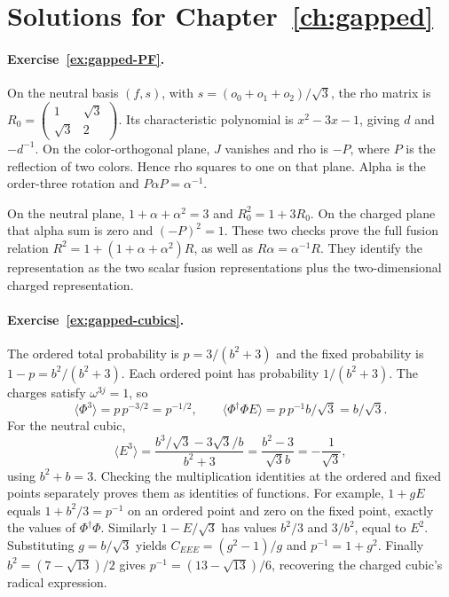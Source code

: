 \section{Solutions for Chapter~\ref{ch:gapped}}

\paragraph{Exercise~\ref{ex:gapped-PF}.}
\label{sol:ex:gapped-PF}
On the neutral basis $(f,s)$, with
$s=(o_0+o_1+o_2)/\sqrt3$, the rho matrix is
$R_0=\left(\begin{smallmatrix}1&\sqrt3\\\sqrt3&2\end{smallmatrix}\right)$.
Its characteristic polynomial is $x^2-3x-1$, giving $d$ and
$-d^{-1}$. On the color-orthogonal plane, $J$ vanishes and
rho is $-P$, where $P$ is the reflection of two colors. Hence
rho squares to one on that plane. Alpha is the order-three
rotation and $P\alpha P=\alpha^{-1}$.

On the neutral plane, $1+\alpha+\alpha^2=3$ and
$R_0^2=1+3R_0$. On the charged plane that alpha sum is zero
and $(-P)^2=1$. These two checks prove the full fusion relation
$R^2=1+(1+\alpha+\alpha^2)R$, as well as
$R\alpha=\alpha^{-1}R$. They identify the representation as
the two scalar fusion representations plus the two-dimensional
charged representation.



\paragraph{Exercise~\ref{ex:gapped-cubics}.}
\label{sol:ex:gapped-cubics}
The ordered total probability is $p=3/(b^2+3)$ and the fixed
probability is $1-p=b^2/(b^2+3)$. Each ordered point has probability
$1/(b^2+3)$. The charges satisfy $\omega^{3j}=1$, so
\[
 \langle\Phi^3\rangle=p\,p^{-3/2}=p^{-1/2},\qquad
 \langle\Phi^\dagger\Phi E\rangle=p\,p^{-1}b/\sqrt3=b/\sqrt3.
\]
For the neutral cubic,
\[
 \langle E^3\rangle
 =\frac{b^3/\sqrt3-3\sqrt3/b}{b^2+3}
 =\frac{b^2-3}{\sqrt3 b}=-\frac1{\sqrt3},
\]
using $b^2+b=3$. Checking the multiplication identities at
the ordered and fixed points separately proves them as
identities of functions. For example, $1+gE$ equals
$1+b^2/3=p^{-1}$ on an ordered point and zero on the fixed
point, exactly the values of $\Phi^\dagger\Phi$.
Similarly $1-E/\sqrt3$ has values $b^2/3$ and $3/b^2$,
equal to $E^2$. Substituting $g=b/\sqrt3$ yields
$C_{EEE}=(g^2-1)/g$ and $p^{-1}=1+g^2$.
Finally $b^2=(7-\sqrt{13})/2$ gives
$p^{-1}=(13-\sqrt{13})/6$, recovering the charged cubic's
radical expression.



